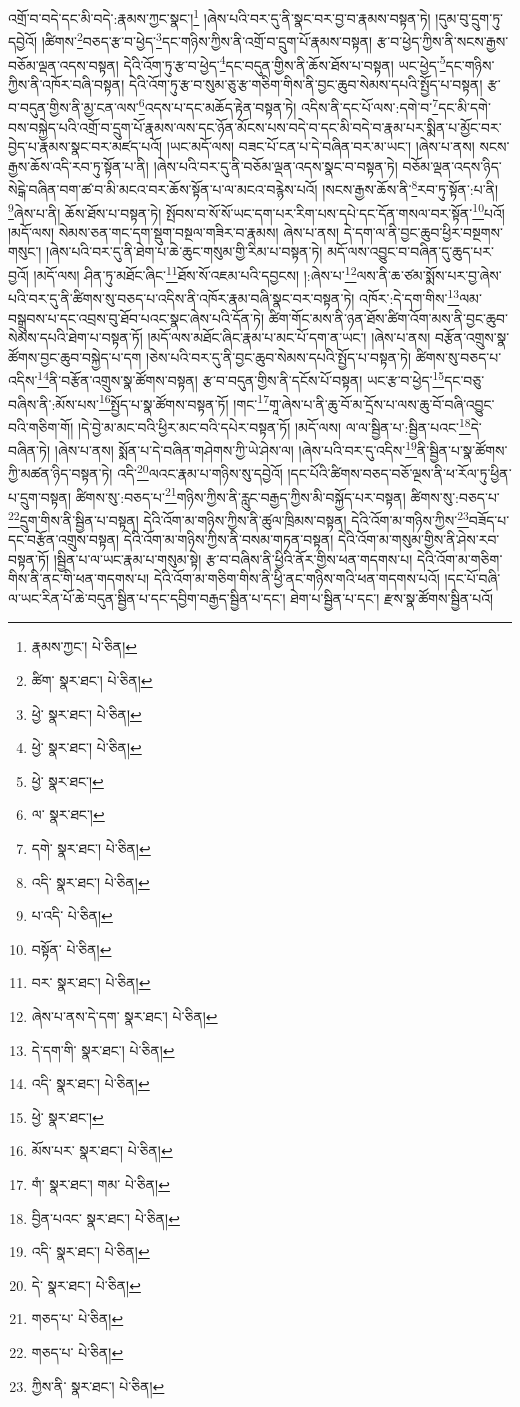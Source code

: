 འགྲོ་བ་བདེ་དང་མི་བདེ་:རྣམས་ཀྱང་སྣང་།\footnote{རྣམས་ཀྱང་།  པེ་ཅིན། } །ཞེས་པའི་བར་དུ་ནི་སྣང་བར་བྱ་བ་རྣམས་བསྟན་ཏེ། །དུམ་བུ་དྲུག་ཏུ་དབྱེའོ། །ཚིགས་\footnote{ཚིག་  སྣར་ཐང་།  པེ་ཅིན། }བཅད་རྩ་བ་ཕྱེད་\footnote{ཕྱེ་  སྣར་ཐང་།  པེ་ཅིན། }དང་གཉིས་ཀྱིས་ནི་འགྲོ་བ་དྲུག་པོ་རྣམས་བསྟན། རྩ་བ་ཕྱེད་ཀྱིས་ནི་སངས་རྒྱས་བཅོམ་ལྡན་འདས་བསྟན། དེའི་འོག་ཏུ་རྩ་བ་ཕྱེད་\footnote{ཕྱེ་  སྣར་ཐང་།  པེ་ཅིན། }དང་བདུན་གྱིས་ནི་ཆོས་ཐོས་པ་བསྟན། ཡང་ཕྱེད་\footnote{ཕྱེ་  སྣར་ཐང་། }དང་གཉིས་ཀྱིས་ནི་འཁོར་བཞི་བསྟན། དེའི་འོག་ཏུ་རྩ་བ་སུམ་ཅུ་རྩ་གཅིག་གིས་ནི་བྱང་ཆུབ་སེམས་དཔའི་སྤྱོད་པ་བསྟན། རྩ་བ་བདུན་གྱིས་ནི་མྱ་ངན་ལས་\footnote{ལ་  སྣར་ཐང་། }འདས་པ་དང་མཆོད་རྟེན་བསྟན་ཏེ། འདིས་ནི་དང་པོ་ལས་:དགེ་བ་\footnote{དགེ་  སྣར་ཐང་།  པེ་ཅིན། }དང་མི་དགེ་བས་བསྐྱེད་པའི་འགྲོ་བ་དྲུག་པོ་རྣམས་ལས་དང་ཉོན་མོངས་པས་བདེ་བ་དང་མི་བདེ་བ་རྣམ་པར་སྨིན་པ་མྱོང་བར་བྱེད་པ་རྣམས་སྣང་བར་མཛད་པའོ། །ཡང་མདོ་ལས། བཟང་པོ་ངན་པ་དེ་བཞིན་བར་མ་ཡང་། །ཞེས་པ་ནས། སངས་རྒྱས་ཆོས་འདི་རབ་ཏུ་སྟོན་པ་ནི། །ཞེས་པའི་བར་དུ་ནི་བཅོམ་ལྡན་འདས་སྣང་བ་བསྟན་ཏེ། བཅོམ་ལྡན་འདས་ཉིད་སེངྒེ་བཞིན་བག་ཚ་བ་མི་མངའ་བར་ཆོས་སྟོན་པ་ལ་མངའ་བརྙེས་པའོ། །སངས་རྒྱས་ཆོས་ནི་\footnote{འདི་  སྣར་ཐང་།  པེ་ཅིན། }རབ་ཏུ་སྟོན་:པ་ནི། \footnote{པ་འདི་  པེ་ཅིན། }ཞེས་པ་ནི། ཆོས་ཐོས་པ་བསྟན་ཏེ། སྤོབས་བ་སོ་སོ་ཡང་དག་པར་རིག་པས་དཔེ་དང་དོན་གསལ་བར་སྟོན་\footnote{བསྟོན་  པེ་ཅིན། }པའོ། །མདོ་ལས། སེམས་ཅན་གང་དག་སྡུག་བསྔལ་གཟིར་བ་རྣམས། ཞེས་པ་ནས། དེ་དག་ལ་ནི་བྱང་ཆུབ་ཕྱིར་བསྔགས་གསུང་། །ཞེས་པའི་བར་དུ་ནི་ཐེག་པ་ཆེ་ཆུང་གསུམ་གྱི་རིམ་པ་བསྟན་ཏེ། མདོ་ལས་འབྱུང་བ་བཞིན་དུ་ཆུད་པར་བྱའོ། །མདོ་ལས། ཤིན་ཏུ་མཐོང་ཞིང་\footnote{བར་  སྣར་ཐང་།  པེ་ཅིན། }ཐོས་སོ་འཇམ་པའི་དབྱངས། །:ཞེས་པ་\footnote{ཞེས་པ་ནས་དེ་དག་  སྣར་ཐང་།  པེ་ཅིན། }ལས་ནི་ཆ་ཙམ་སྨོས་པར་བྱ་ཞེས་པའི་བར་དུ་ནི་ཚིགས་སུ་བཅད་པ་འདིས་ནི་འཁོར་རྣམ་བཞི་སྣང་བར་བསྟན་ཏེ། འཁོར་:དེ་དག་གིས་\footnote{དེ་དག་གི་  སྣར་ཐང་།  པེ་ཅིན། }ལམ་བསྒྲུབས་པ་དང་འབྲས་བུ་ཐོབ་པའང་སྣང་ཞེས་པའི་དོན་ཏེ། ཚིག་གོང་མས་ནི་ཉན་ཐོས་ཚིག་འོག་མས་ནི་བྱང་ཆུབ་སེམས་དཔའི་ཐེག་པ་བསྟན་ཏོ། །མདོ་ལས་མཐོང་ཞིང་རྣམ་པ་མང་པོ་དག་ན་ཡང་། །ཞེས་པ་ནས། བརྩོན་འགྲུས་སྣ་ཚོགས་བྱང་ཆུབ་བསྐྱེད་པ་དག །ཅེས་པའི་བར་དུ་ནི་བྱང་ཆུབ་སེམས་དཔའི་སྤྱོད་པ་བསྟན་ཏེ། ཚིགས་སུ་བཅད་པ་འདིས་\footnote{འདི་  སྣར་ཐང་།  པེ་ཅིན། }ནི་བརྩོན་འགྲུས་སྣ་ཚོགས་བསྟན། རྩ་བ་བདུན་གྱིས་ནི་དངོས་པོ་བསྟན། ཡང་རྩ་བ་ཕྱེད་\footnote{ཕྱེ་  སྣར་ཐང་། }དང་བཅུ་བཞིས་ནི་:མོས་པས་\footnote{མོས་པར་  སྣར་ཐང་།  པེ་ཅིན། }སྤྱོད་པ་སྣ་ཚོགས་བསྟན་ཏོ། །གང་\footnote{གཾ་  སྣར་ཐང་། གམ་  པེ་ཅིན། }གཱ་ཞེས་པ་ནི་ཆུ་བོ་མ་དྲོས་པ་ལས་ཆུ་བོ་བཞི་འབྱུང་བའི་གཅིག་གོ། །དེ་བྱེ་མ་མང་བའི་ཕྱིར་མང་བའི་དཔེར་བསྟན་ཏོ། །མདོ་ལས། ལ་ལ་སྦྱིན་པ་:སྦྱིན་པའང་\footnote{བྱིན་པའང་  སྣར་ཐང་།  པེ་ཅིན། }དེ་བཞིན་ཏེ། །ཞེས་པ་ནས། སྨོན་པ་དེ་བཞིན་གཤེགས་ཀྱི་ཡེ་ཤེས་ལ། །ཞེས་པའི་བར་དུ་འདིས་\footnote{འདི་  སྣར་ཐང་།  པེ་ཅིན། }ནི་སྦྱིན་པ་སྣ་ཚོགས་ཀྱི་མཚན་ཉིད་བསྟན་ཏེ། འདི་\footnote{དེ་  སྣར་ཐང་།  པེ་ཅིན། }ལའང་རྣམ་པ་གཉིས་སུ་དབྱེའོ། །དང་པོའི་ཚིགས་བཅད་བཅོ་ལྔས་ནི་ཕ་རོལ་ཏུ་ཕྱིན་པ་དྲུག་བསྟན། ཚིགས་སུ་:བཅད་པ་\footnote{གཅད་པ་  པེ་ཅིན། }གཉིས་ཀྱིས་ནི་རླུང་བརྒྱད་ཀྱིས་མི་བསྐྱོད་པར་བསྟན། ཚིགས་སུ་:བཅད་པ་\footnote{གཅད་པ་  པེ་ཅིན། }དྲུག་གིས་ནི་སྦྱིན་པ་བསྟན། དེའི་འོག་མ་གཉིས་ཀྱིས་ནི་ཚུལ་ཁྲིམས་བསྟན། དེའི་འོག་མ་གཉིས་ཀྱིས་\footnote{ཀྱིས་ནི་  སྣར་ཐང་།  པེ་ཅིན། }བཟོད་པ་དང་བརྩོན་འགྲུས་བསྟན། དེའི་འོག་མ་གཉིས་ཀྱིས་ནི་བསམ་གཏན་བསྟན། དེའི་འོག་མ་གསུམ་གྱིས་ནི་ཤེས་རབ་བསྟན་ཏོ། །སྦྱིན་པ་ལ་ཡང་རྣམ་པ་གསུམ་སྟེ། རྩ་བ་བཞིས་ནི་ཕྱིའི་ནོར་གྱིས་ཕན་གདགས་པ། དེའི་འོག་མ་གཅིག་གིས་ནི་ནང་གི་ཕན་གདགས་པ། དེའི་འོག་མ་གཅིག་གིས་ནི་ཕྱི་ནང་གཉིས་གའི་ཕན་གདགས་པའོ། །དང་པོ་བཞི་ལ་ཡང་རིན་པོ་ཆེ་བདུན་སྦྱིན་པ་དང་དབྱིག་བརྒྱད་སྦྱིན་པ་དང་། ཐེག་པ་སྦྱིན་པ་དང་། རྫས་སྣ་ཚོགས་སྦྱིན་པའོ། 